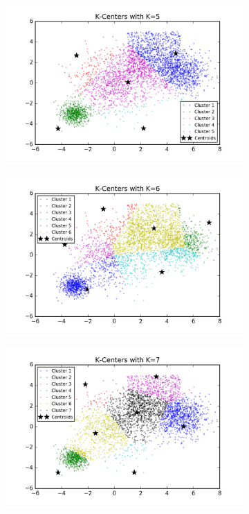 \begin{description}
\begin{description}
\begin{figure}[!h]
\begin{subfigure}[b]{0.475\textwidth}
            \includegraphics[width=\textwidth]{./figures/bigClustering_kCenter_5.png}
        \end{subfigure}
        \hfill
        \begin{subfigure}[b]{0.475\textwidth}   
            \centering 
            \includegraphics[width=\textwidth]{./figures/bigClustering_kCenter_6.png}
        \end{subfigure}
        \begin{subfigure}[b]{0.475\textwidth}   
            \centering 
            \includegraphics[width=\textwidth]{./figures/bigClustering_kCenter_7.png}

\end{subfigure}
\end{figure}
\end{description}
\end{description}
